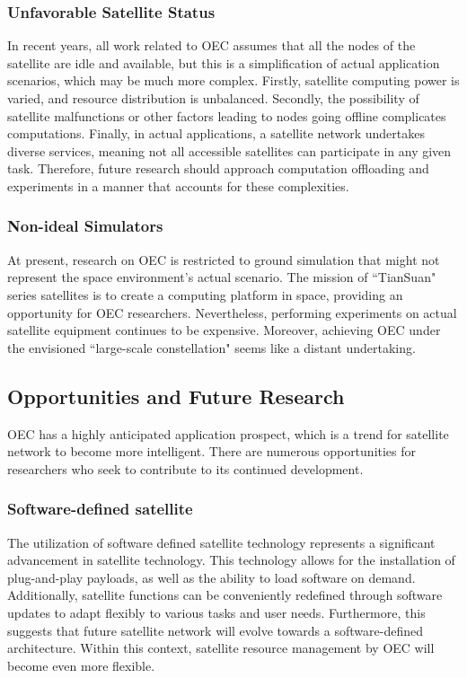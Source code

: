 \documentclass[lettersize,journal]{IEEEtran}
\begin{document}
\subsubsection*{Unfavorable Satellite Status} In recent years, all work related to OEC assumes that all the nodes of the satellite are idle and available, but this is a simplification of actual application scenarios, which may be much more complex. Firstly, satellite computing power is varied, and resource distribution is unbalanced. Secondly, the possibility of satellite malfunctions or other factors leading to nodes going offline complicates computations. Finally, in actual applications, a satellite network undertakes diverse services, meaning not all accessible satellites can participate in any given task. Therefore, future research should approach computation offloading and experiments in a manner that accounts for these complexities.

\subsubsection*{Non-ideal Simulators} At present, research on OEC is restricted to ground simulation that might not represent the space environment's actual scenario. The mission of ``TianSuan" series satellites \cite{RN13} is to create a computing platform in space, providing an opportunity for OEC researchers. Nevertheless, performing experiments on actual satellite equipment continues to be expensive. Moreover, achieving OEC under the envisioned ``large-scale constellation" seems like a distant undertaking.




\subsection{Opportunities and Future Research}
OEC has a highly anticipated application prospect, which is a trend for satellite network to become more intelligent. There are numerous opportunities for researchers who seek to contribute to its continued development.

\subsubsection*{Software-defined satellite}
The utilization of software defined satellite technology represents a significant advancement in satellite technology. This technology allows for the installation of plug-and-play payloads, as well as the ability to load software on demand. Additionally, satellite functions can be conveniently redefined through software updates to adapt flexibly to various tasks and user needs. Furthermore, this suggests that future satellite network will evolve towards a software-defined architecture. Within this context, satellite resource management by OEC will become even more flexible.
\end{document}
